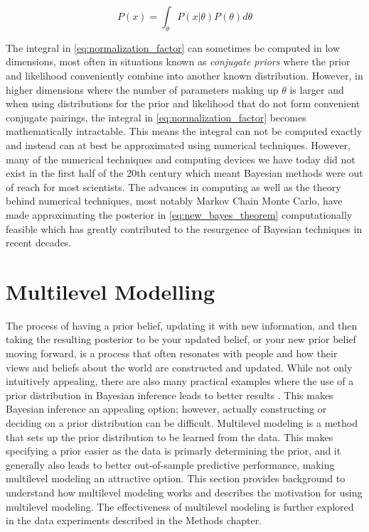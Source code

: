 \begin{equation} \label{eq:normalization_factor}
P(x) = \int_{\theta} P(x|\theta)P(\theta) d\theta
\end{equation}

The integral in \ref{eq:normalization_factor} can sometimes be computed in low dimensions, most often in situations known as \textit{conjugate priors} where the prior and likelihood conveniently combine into another known distribution. However, in higher dimensions where the number of parameters making up $\theta$ is larger and when using distributions for the prior and likelihood that do not form convenient conjugate pairings, the integral in \ref{eq:normalization_factor} becomes mathematically intractable. This means the integral can not be computed exactly and instead can at best be approximated using numerical techniques. However, many of the numerical techniques and computing devices we have today did not exist in the first half of the 20th century which meant Bayesian methods were out of reach for most scientists. The advances in computing as well as the theory behind numerical techniques, most notably Markov Chain Monte Carlo, have made approximating the posterior in \ref{eq:new_bayes_theorem} computationally feasible which has greatly contributed to the resurgence of Bayesian techniques in recent decades.

\section{Multilevel Modelling} \label{Multilevel_Modelling}

The process of having a prior belief, updating it with new information, and then taking the resulting posterior to be your updated belief, or your new prior belief moving forward, is a process that often resonates with people and how their views and beliefs about the world are constructed and updated. While not only intuitively appealing, there are also many practical examples where the use of a prior distribution in Bayesian inference leads to better results \cite{Schoot2021}. This makes Bayesian inference an appealing option; however, actually constructing or deciding on a prior distribution can be difficult. Multilevel modeling is a method that sets up the prior distribution to be learned from the data. This makes specifying a prior easier as the data is primarly determining the prior, and it generally also leads to better out-of-sample predictive performance, making multilevel modeling an attractive option. This section provides background to understand how multilevel modeling works and describes the motivation for using multilevel modeling. The effectiveness of multilevel modeling is further explored in the data experiments described in the Methods chapter.

